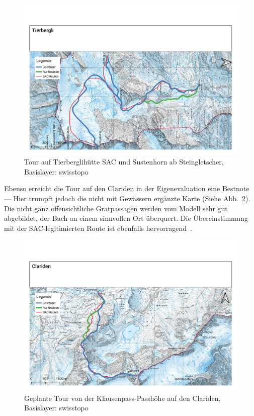 \begin{figure}[hb]
  \centering
  \includegraphics[page=1,width=.9\linewidth]{./../evaluation/PDFs/Tierbergli.pdf}
  \caption{Tour auf Tierberglihütte SAC und Sustenhorn ab Steingletscher, \\Basislayer: swisstopo}\label{fig:tierbergli}
\end{figure}


Ebenso erreicht die Tour auf den Clariden in der Eigenevaluation eine Bestnote --- Hier trumpft jedoch die nicht mit Gewässern ergänzte Karte (Siehe Abb.\ \ref{fig:clariden}). Die nicht ganz offensichtliche Gratpassagen werden vom Modell sehr gut abgebildet, der Bach an einem sinnvollen Ort überquert. Die Übereinstimmung mit der SAC-legitimierten Route ist ebenfalls hervorragend~\cite{twslstgallappzll}.

\begin{figure}[b]
  \centering
  \includegraphics[page=1,width=.9\linewidth]{./../evaluation/PDFs/Clariden.pdf}
  \caption{Geplante Tour von der Klausenpass-Passhöhe auf den Clariden, \\Basislayer: swisstopo}\label{fig:clariden}
\end{figure}

